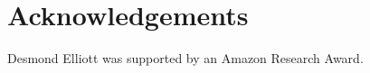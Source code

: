 








% 




\section*{Acknowledgements}
Desmond Elliott was supported by an Amazon Research Award.

%

%
%

%
%

